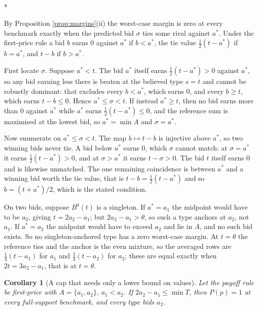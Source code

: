 \documentclass[12pt]{article}
\makeatletter
\newtheorem{corollary}{Corollary}
\theoremstyle{definition}
\renewenvironment{proof}[1][\proofname]{\par
  \pushQED{\qed}%
  \normalfont \topsep6\p@\@plus6\p@\relax
  \trivlist
  \item[\hskip\labelsep\itshape #1\@addpunct{.}]\mbox{}\\*
  \ignorespaces
}{%
  \popQED\endtrivlist\@endpefalse
}
\makeatother
\begin{document}
\begin{proof}[Proof of Corollary \ref{cor:fpmargins}]
By Proposition \ref{prop:margins}(ii) the worst-case margin is zero at every benchmark exactly when the predicted bid $\sigma$ ties some rival against $a^*$. Under the first-price rule a bid $b$ earns $0$ against $a^*$ if $b < a^*$, the tie value $\tfrac12(t - a^*)$ if $b = a^*$, and $t - b$ if $b > a^*$.

First locate $\sigma$. Suppose $a^* < t$. The bid $a^*$ itself earns $\tfrac12(t - a^*) > 0$ against $a^*$, so any bid earning less there is beaten at the believed type $s = t$ and cannot be robustly dominant: that excludes every $b < a^*$, which earns $0$, and every $b \ge t$, which earns $t - b \le 0$. Hence $a^* \le \sigma < t$. If instead $a^* \ge t$, then no bid earns more than $0$ against $a^*$ while $a^*$ earns $\tfrac12(t-a^*) \le 0$, and the reference sum is maximised at the lowest bid, so $a^* = \min A$ and $\sigma = a^*$.

Now enumerate on $a^* \le \sigma < t$. The map $b \mapsto t - b$ is injective above $a^*$, so two winning bids never tie. A bid below $a^*$ earns $0$, which $\sigma$ cannot match: at $\sigma = a^*$ it earns $\tfrac12(t-a^*) > 0$, and at $\sigma > a^*$ it earns $t - \sigma > 0$. The bid $t$ itself earns $0$ and is likewise unmatched. The one remaining coincidence is between $a^*$ and a winning bid worth the tie value, that is $t - b = \tfrac12(t - a^*)$ and so $b = (t + a^*)/2$, which is the stated condition.

On two bids, suppose $B^0(t)$ is a singleton. If $a^* = a_1$ the midpoint would have to be $a_2$, giving $t = 2a_2 - a_1$; but $2a_2 - a_1 > \theta$, so such a type anchors at $a_2$, not $a_1$. If $a^* = a_2$ the midpoint would have to exceed $a_2$ and lie in $A$, and no such bid exists. So no singleton-anchored type has a zero worst-case margin. At $t = \theta$ the reference ties and the anchor is the even mixture, so the averaged rows are $\tfrac14(t - a_1)$ for $a_1$ and $\tfrac34(t - a_2)$ for $a_2$; these are equal exactly when $2t = 3a_2 - a_1$, that is at $t = \theta$.
\end{proof}

\begin{corollary}[A cap that needs only a lower bound on values]\label{cor:floor}
Let the payoff rule be first-price with $A = \{a_1, a_2\}$, $a_1 < a_2$. If $2a_2 - a_1 \le \min T$, then $P(p) = 1$ at every full-support benchmark, and every type bids $a_2$.
\end{corollary}
\end{document}
